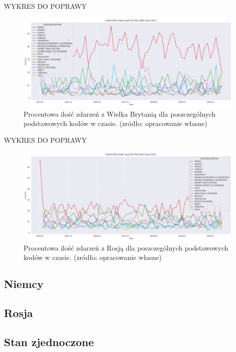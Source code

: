 \documentclass[11pt]{report}
\begin{document}
    WYKRES DO POPRAWY
    \begin{figure}[ht]
        \centering
        \includegraphics[width=1 \textwidth]{fig/PL/POLGBRERCperc.png}
        \caption{Procentowa ilość zdarzeń z Wielka Brytanią dla poszczególnych podstawowych kodów w czasie. (zródło: opracowanie własne)}
        \label{fig:PLGBRERC}
    \end{figure}

    WYKRES DO POPRAWY
    \begin{figure}[ht]
        \centering
        \includegraphics[width=1 \textwidth]{fig/PL/POLRUSERCperc.png}
        \caption{Procentowa ilość zdarzeń z Rosją dla poszczególnych podstawowych kodów w czasie. (zródło: opracowanie własne)}
        \label{fig:PLRUSERC}
    \end{figure}

    \subsection{Niemcy}

    \subsection{Rosja}

    \subsection{Stan zjednoczone}
\end{document}
